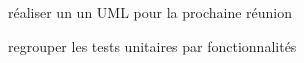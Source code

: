 
\begin{DoxyItemize}
\item réaliser un un U\+ML pour la prochaine réunion
\item regrouper les tests unitaires par fonctionnalités 
\end{DoxyItemize}